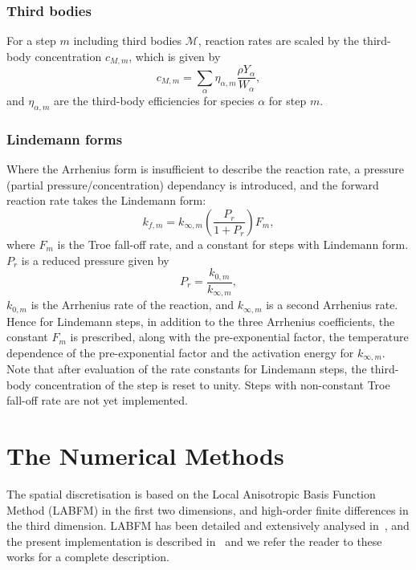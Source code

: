 \documentclass[notitlepage]{revtex4-1}
\begin{document}
\subsubsection{Third bodies}

For a step $m$ including third bodies $\mathcal{M}$, reaction rates are scaled by the third-body concentration $c_{M,m}$, which is given by
\begin{equation}c_{M,m}=\displaystyle\sum_{\alpha}\eta_{\alpha,m}\frac{\rho{Y}_{\alpha}}{W_{\alpha}},\end{equation}
and $\eta_{\alpha,m}$ are the third-body efficiencies for species $\alpha$ for step $m$.

\subsubsection{Lindemann forms}

Where the Arrhenius form is insufficient to describe the reaction rate, a pressure (partial pressure/concentration) dependancy is introduced, and the forward reaction rate takes the Lindemann form:
\begin{equation}k_{f,m}=k_{\infty,m}\left(\frac{P_{r}}{1+P_{r}}\right)F_{m},\end{equation}
where $F_{m}$ is the Troe fall-off rate, and a constant for steps with Lindemann form. $P_{r}$ is a reduced pressure given by
\begin{equation}P_{r}=\frac{k_{0,m}}{k_{\infty,m}},\end{equation}
$k_{0,m}$ is the Arrhenius rate of the reaction, and $k_{\infty,m}$ is a second Arrhenius rate. Hence for Lindemann steps, in addition to the three Arrhenius coefficients, the constant $F_{m}$ is prescribed, along with the pre-exponential factor, the temperature dependence of the pre-exponential factor and the activation energy for $k_{\infty,m}$. Note that after evaluation of the rate constants for Lindemann steps, the third-body concentration of the step is reset to unity. Steps with non-constant Troe fall-off rate are not yet implemented.

\section{The Numerical Methods}\label{ni}

The spatial discretisation is based on the Local Anisotropic Basis Function Method (LABFM) in the first two dimensions, and high-order finite differences in the third dimension. LABFM has been detailed and extensively analysed in~\cite{king_2020,king_2022}, and the present implementation is described in~\cite{king_2023} and we refer the reader to these works for a complete description.
\end{document}
